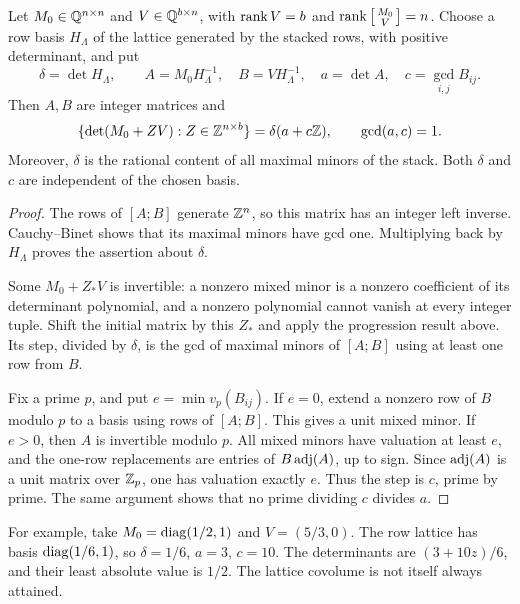\begin{theorem}\label{thm:row-lattice}
Let $M_0\in\mathbb Q^{n\times n}$ and $V\in\mathbb Q^{b\times n}$, with
$\operatorname{rank} V=b$ and $\operatorname{rank}\left[\begin{smallmatrix}M_0\\V\end{smallmatrix}\right]=n$.
Choose a row basis $H_\Lambda$ of the lattice generated by the stacked
rows, with positive determinant, and put
\[
 \delta=\det H_\Lambda,\qquad
 A=M_0H_\Lambda^{-1},\quad B=VH_\Lambda^{-1},\quad
 a=\det A,\quad c=\gcd_{i,j}B_{ij}.
\]
Then $A,B$ are integer matrices and
\begin{equation}\label{eq:content-progression}
 \{\det(M_0+ZV):Z\in\mathbb Z^{n\times b}\}
       =\delta(a+c\mathbb Z),\qquad \gcd(a,c)=1.
\end{equation}
Moreover, $\delta$ is the rational content of all maximal minors
of the stack. Both $\delta$ and $c$ are independent of the chosen basis.
\end{theorem}
\begin{proof}
The rows of $[A;B]$ generate $\mathbb Z^n$, so this matrix has an integer
left inverse. Cauchy--Binet shows that its maximal minors have gcd
one. Multiplying back by $H_\Lambda$ proves the assertion about
$\delta$.

Some $M_0+Z_*V$ is invertible: a nonzero mixed minor is a nonzero
coefficient of its determinant polynomial, and a nonzero polynomial
cannot vanish at every integer tuple. Shift the initial matrix by
this $Z_*$ and apply the progression result above. Its step, divided
by $\delta$, is the gcd of maximal minors of $[A;B]$ using at least
one row from $B$.

Fix a prime $p$, and put $e=\min v_p(B_{ij})$. If $e=0$, extend a
nonzero row of $B$ modulo $p$ to a basis using rows of $[A;B]$.
This gives a unit mixed minor. If $e>0$, then $A$ is invertible
modulo $p$. All mixed minors have valuation at least $e$, and the
one-row replacements are entries of $B\operatorname{adj}(A)$, up to sign. Since
$\operatorname{adj}(A)$ is a unit matrix over $\mathbb Z_p$, one has valuation exactly
$e$. Thus the step is $c$, prime by prime. The same argument shows
that no prime dividing $c$ divides $a$.
\end{proof}

For example, take $M_0=\operatorname{diag}(1/2,1)$ and $V=(5/3,0)$.
The row lattice has basis $\operatorname{diag}(1/6,1)$, so $\delta=1/6$, $a=3$,
$c=10$. The determinants are $(3+10z)/6$, and their least absolute
value is $1/2$. The lattice covolume is not itself always attained.

